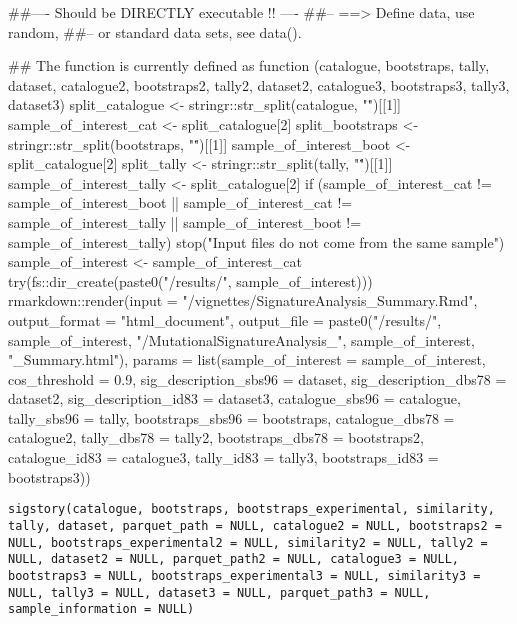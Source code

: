 \documentclass[a4paper]{book}
\begin{document}
\begin{Examples}
\begin{ExampleCode}
##---- Should be DIRECTLY executable !! ----
##-- ==>  Define data, use random,
##--	or standard data sets, see data().

## The function is currently defined as
function (catalogue, bootstraps, tally, dataset, catalogue2, 
    bootstraps2, tally2, dataset2, catalogue3, bootstraps3, tally3, 
    dataset3) 
{
    split_catalogue <- stringr::str_split(catalogue, "\.")[[1]]
    sample_of_interest_cat <- split_catalogue[2]
    split_bootstraps <- stringr::str_split(bootstraps, "\.")[[1]]
    sample_of_interest_boot <- split_catalogue[2]
    split_tally <- stringr::str_split(tally, "\.")[[1]]
    sample_of_interest_tally <- split_catalogue[2]
    if (sample_of_interest_cat != sample_of_interest_boot || 
        sample_of_interest_cat != sample_of_interest_tally || 
        sample_of_interest_boot != sample_of_interest_tally) {
        stop("Input files do not come from the same sample")
    }
    sample_of_interest <- sample_of_interest_cat
    try(fs::dir_create(paste0("/results/", sample_of_interest)))
    rmarkdown::render(input = "/vignettes/SignatureAnalysis_Summary.Rmd", 
        output_format = "html_document", output_file = paste0("/results/", 
            sample_of_interest, "/MutationalSignatureAnalysis_", 
            sample_of_interest, "_Summary.html"), params = list(sample_of_interest = sample_of_interest, 
            cos_threshold = 0.9, sig_description_sbs96 = dataset, 
            sig_description_dbs78 = dataset2, sig_description_id83 = dataset3, 
            catalogue_sbs96 = catalogue, tally_sbs96 = tally, 
            bootstraps_sbs96 = bootstraps, catalogue_dbs78 = catalogue2, 
            tally_dbs78 = tally2, bootstraps_dbs78 = bootstraps2, 
            catalogue_id83 = catalogue3, tally_id83 = tally3, 
            bootstraps_id83 = bootstraps3))
  }
\end{ExampleCode}
\end{Examples}
%
\begin{Usage}
\begin{verbatim}
sigstory(catalogue, bootstraps, bootstraps_experimental, similarity, tally, dataset, parquet_path = NULL, catalogue2 = NULL, bootstraps2 = NULL, bootstraps_experimental2 = NULL, similarity2 = NULL, tally2 = NULL, dataset2 = NULL, parquet_path2 = NULL, catalogue3 = NULL, bootstraps3 = NULL, bootstraps_experimental3 = NULL, similarity3 = NULL, tally3 = NULL, dataset3 = NULL, parquet_path3 = NULL, sample_information = NULL)
\end{verbatim}
\end{Usage}
\end{document}
